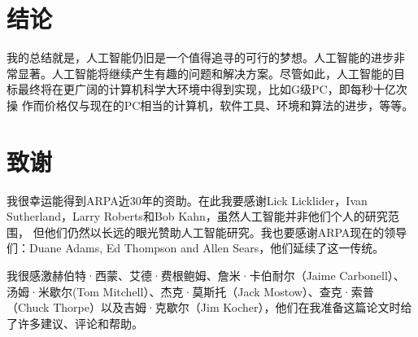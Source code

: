 \documentclass[12pt,a4paper]{article}
\begin{document}
\section{结论}

我的总结就是，人工智能仍旧是一个值得追寻的可行的梦想。人工智能的进步非
常显著。人工智能将继续产生有趣的问题和解决方案。尽管如此，人工智能的目
标最终将在更广阔的计算机科学大环境中得到实现，比如G级PC，即每秒十亿次操
作而价格仅与现在的PC相当的计算机，软件工具、环境和算法的进步，等等。

\section{致谢}

我很幸运能得到ARPA近30年的资助。在此我要感谢Lick Licklider，Ivan
Sutherland，Larry Roberts和Bob Kahn，虽然人工智能并非他们个人的研究范围，
但他们仍然以长远的眼光赞助人工智能研究。我也要感谢ARPA现在的领导
们：Duane Adams, Ed Thompson and Allen Sears，他们延续了这一传统。

我很感激赫伯特·西蒙、艾德·费根鲍姆、詹米·卡伯耐尔（Jaime Carbonell）、
汤姆·米歇尔(Tom Mitchell）、杰克·莫斯托（Jack Mostow）、查克·索普
（Chuck Thorpe）以及吉姆·克歇尔（Jim Kocher），他们在我准备这篇论文时给
了许多建议、评论和帮助。
\end{document}
